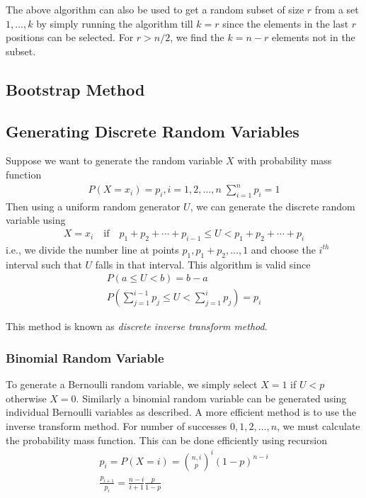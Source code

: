 \documentclass[../probability-notes.tex]{subfiles}
\begin{document}
    The above algorithm can also be used to get a random subset of size $r$ from a set $1, \dots, k$ by simply running the algorithm till $k = r$ since the elements in the last $r$ positions can be selected. For $r > n/2$, we find the $k=n-r$ elements not in the subset.


    \subsection{Bootstrap Method}


    \subsection{Generating Discrete Random Variables}
    Suppose we want to generate the random variable $X$ with probability mass function
    \begin{align*}
        P(X = x_{i}) = p_{i}, i = 1, 2, \ldots, n\; \sum_{i=1}^{n} p_{i} = 1 
    \end{align*}
    Then using a uniform random generator $U$, we can generate the discrete random variable using
    \begin{align*}
        X = x_{i} \quad \text{if} \quad p_{1} + p_{2} +\cdots + p_{i-1} \leq U < p_{1} + p_{2} +\cdots + p_{i} 
    \end{align*}
    i.e., we divide the number line at points $p_{1}, p_{1}+p_{2}, \ldots, 1$ and choose the $i^{th}$ interval such that $U$ falls in that interval. This algorithm is valid since
    \begin{gather*}
        P(a \leq U < b) = b-a\\
        P(\sum_{j=1}^{i-1}p_{j} \leq U < \sum_{j=1}^{i}p_{j}) = p_{i}
    \end{gather*}

    This method is known as \emph{discrete inverse transform method}.\newline


    \subsubsection{Binomial Random Variable}
    To generate a Bernoulli random variable, we simply select $X = 1$ if $U < p$ otherwise $X = 0$. Similarly a binomial random variable can be generated using individual Bernoulli variables as described. A more efficient method is to use the inverse transform method. For number of successes $0, 1, 2, \ldots, n$, we must calculate the probability mass function. This can be done efficiently using recursion
    \begin{gather*}
        p_{i} = P(X = i) = \binom{n, i} p^{i} (1-p)^{n-i}\\
        \frac{p_{i+1}}{p_{i}} = \frac{n-i}{i+1} \frac{p}{1-p}
    \end{gather*}
\end{document}
